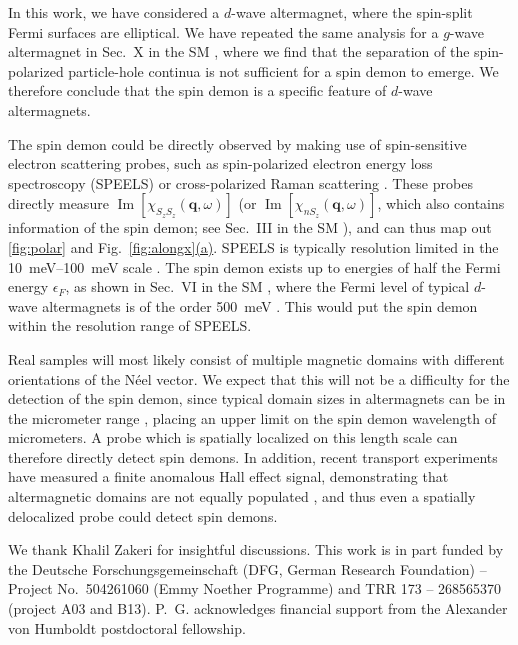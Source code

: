 \documentclass[aps,prl,reprint,twocolumns,superscriptaddress]{revtex4-2}
\DeclareMathOperator{\Imm}{Im}
\newcommand{\subfigref}[2]{Fig.~\hyperref[#1]{\ref*{#1}#2}}
\begin{document}
	
	In this work, we have considered a $d$-wave altermagnet, where the spin-split Fermi surfaces are elliptical. We have repeated the same analysis for a $g$-wave altermagnet in Sec.~X in the SM \cite{Note1}, where we find that the separation of the spin-polarized particle-hole continua is not sufficient for a spin demon to emerge. We therefore conclude that the spin demon is a specific feature of $d$-wave altermagnets.
	
	
	
	The spin demon could be directly observed by making use of spin-sensitive electron scattering probes, such as spin-polarized electron energy loss spectroscopy (SPEELS) \cite{plihalSpinWaveSignature1999} or cross-polarized Raman scattering \cite{kimPolarizedRamanSpectroscopy2020}. These probes directly measure $\Imm[\chi_{S_zS_z}(\bm q,\omega)]$ (or $\Imm[\chi_{nS_z}(\bm q,\omega)]$, which also contains information of the spin demon; see Sec.~III in the SM \cite{Note1}), and can thus map out \cref{fig:polar} and \subfigref{fig:alongx}{(a)}. SPEELS is typically resolution limited in the \SIrange{10}{100}{meV} scale  \cite{vasilyevDesignPerformanceSpinpolarized2016, zakeriGenerationSpinpolarizedHot2021}. The spin demon exists up to energies of half the Fermi energy $\epsilon_F$, as shown in Sec.~VI in the SM \cite{Note1}, where the Fermi level of typical $d$-wave altermagnets is of the order \SI{500}{meV} \cite{smejkalEmergingResearchLandscape2022}. This would put the spin demon within the resolution range of SPEELS. 
	
	Real samples will most likely consist of multiple magnetic domains with different orientations of the N\'eel vector. We expect that this will not be a difficulty for the detection of the spin demon, since typical domain sizes in altermagnets can be in the micrometer range \cite{aminNanoscaleImagingControl2024a}, placing an upper limit on the spin demon wavelength of micrometers. A probe which is spatially localized on this length scale can therefore directly detect spin demons. In addition, recent transport experiments have measured a finite anomalous Hall effect signal, demonstrating that altermagnetic domains are not equally populated \cite{jeongMetallicityAnomalousHall2025a,leiviskaAnisotropyAnomalousHall2024, reichlovaObservationSpontaneousAnomalous2024a}, and thus even a spatially delocalized probe could detect spin demons.
	\begin{acknowledgments}
		We thank Khalil Zakeri for insightful discussions. This work is in part funded by the Deutsche Forschungsgemeinschaft (DFG, German Research Foundation) -- Project No.~504261060 (Emmy Noether Programme) and TRR 173 -- 268565370 (project A03 and B13). P.~G. acknowledges financial support from the Alexander von Humboldt postdoctoral fellowship. 
	\end{acknowledgments}
	
\end{document}
